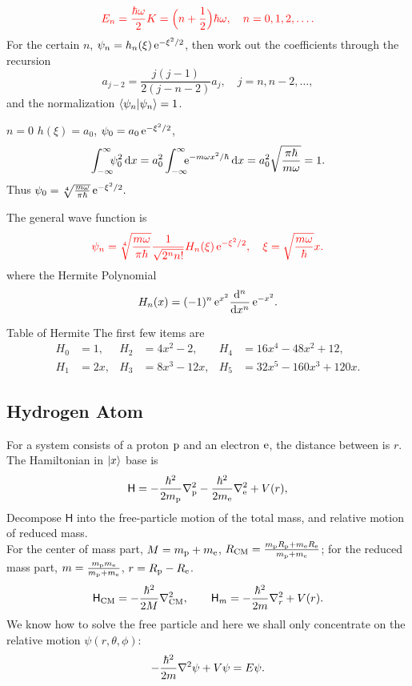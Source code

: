 \documentclass{article}
\newcommand*{\op}[1]{\mathsf{#1}}
\newcommand{\ko}[1]{\hspace{-#1 pt}}
\newcommand{\spark}[1]{\textcolor{red}{#1}}
\begin{document}
$$\spark{E_n=\frac{\hbar\omega}2K=\Bigl(n+\frac12\Bigr)\hbar\omega,\quad n=0,1,2,\ldots.}$$
For the certain $n$, $\psi_n=h_n(\xi)\e^{-\xi^2/2}$, then work out the coefficients through the recursion
$$a_{j-2}=\frac{j(j-1)}{2(j-n-2)}a_j,\quad j=n,n-2,\ldots,$$
and the normalization $\brkt{\psi_n}{\psi_n}=1$.
\begin{example}{$n=0$}{}
	$h(\xi)=a_0$, $\psi_0=a_0\e^{-\xi^2/2}$,
	$$\intR \ko5\psi_0^2\d x=a_0^2\intR \ko5\e^{-m\omega x^2/\hbar}\d x=a_0^2\sqrt{\frac{\pi\hbar}{m\omega}}=1.$$
	Thus
	$\psi_0=\sqrt[4]{\frac{m\omega}{\pi\hbar}}\e^{-\xi^2/2}.$
\end{example}
The general wave function is
$$\spark{\psi_n=\sqrt[4]{\frac{m\omega}{\pi\hbar}}\frac1{\sqrt{2^nn!}}H_n(\xi)\e^{-\xi^2/2},\quad\xi=\sqrt{\frac{m\omega}\hbar}x.}$$
where the Hermite Polynomial 
$$H_n(x)=(-1)^n\e^{x^2}\dd[n]{x}\e^{-x^2}.$$
\begin{example}{Table of Hermite}{}
	The first few items are %
	\begin{align*}
		H_0 & =1,  & H_2 & =4x^2-2,   & H_4 & =16x^4-48x^2+12,    \\
		H_1 & =2x, & H_3 & =8x^3-12x, & H_5 & =32x^5-160x^3+120x.
	\end{align*}

\end{example}
\clearpage
\subsection{Hydrogen Atom}
For a system consists of a proton $\proton$ and an electron $\electron$, the distance between is $r$. The Hamiltonian in $\ket x$ base is
$$\op{H}=-\frac{\hbar^2}{2m_{\proton}}\laplacian_{\proton}-\frac{\hbar^2}{2m_{\electron}}\laplacian_{\electron}+V(r),$$
Decompose $\op{H}$ into the free-particle motion of the total mass, and relative motion of reduced mass.\\
For the center of mass part, $M=m_{\proton}+m_{\electron}$, $R_{\CM}=\frac{m_{\proton}R_{\proton}+m_{\electron}R_{\electron}}{m_{\proton}+m_{\electron}}$; for the reduced mass part, $m=\frac{m_{\proton}m_{\electron}}{m_{\proton}+m_{\electron}}$, $r=R_{\proton}-R_{\electron}$.
$$\op{H}_{\CM}=-\frac{\hbar^2}{2M}\nabla_{\CM}^2,\qquad\op{H}_m=-\frac{\hbar^2}{2m}\nabla_r^2+V(r).$$
We know how to solve the free particle and here we shall only concentrate on the relative motion $\psi(r,\theta,\phi)$:
\begin{align}\label{s-eqn}
	-\frac{\hbar^2}{2m}\laplacian\psi+V\psi=E\psi.
\end{align}
\end{document}
